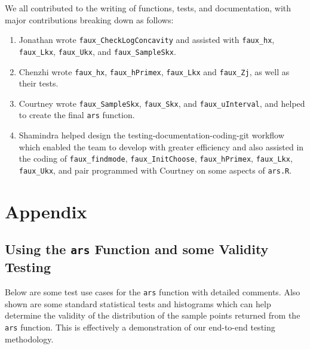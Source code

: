 \documentclass{article}\usepackage[]{graphicx}\usepackage[]{color}
\begin{document}
We all contributed to the writing of functions, tests, and documentation,
with major contributions breaking down as follows:
\begin{enumerate}
	\item Jonathan wrote \texttt{faux\_CheckLogConcavity} and assisted with
	\texttt{faux\_hx}, \texttt{faux\_Lkx}, \texttt{faux\_Ukx}, and
	\texttt{faux\_SampleSkx}.
	\item Chenzhi wrote \texttt{faux\_hx}, \texttt{faux\_hPrimex}, \texttt{faux\_Lkx}    and \texttt{faux\_Zj}, as well as their tests.
	\item Courtney wrote \texttt{faux\_SampleSkx}, \texttt{faux\_Skx}, and
	\texttt{faux\_uInterval}, and helped to create the final \texttt{ars} function.
	\item Shamindra helped design the testing-documentation-coding-git workflow
    which enabled the team to develop with greater efficiency and also assisted 
    in the coding of \texttt{faux\_findmode}, \texttt{faux\_InitChoose}, \texttt{faux\_hPrimex}, 
    \texttt{faux\_Lkx}, \texttt{faux\_Ukx}, and pair programmed with Courtney on some aspects of \texttt{ars.R}.
\end{enumerate}

\newpage

\section{Appendix}

\subsection{Using the \texttt{ars} Function and some Validity Testing}

Below are some test use cases for the \texttt{ars} function with detailed 
comments. Also shown are some standard statistical tests and histograms which
can help determine the validity of the distribution of the sample points
returned from the \texttt{ars} function. This is effectively a demonstration of 
our end-to-end testing methodology.
\end{document}
